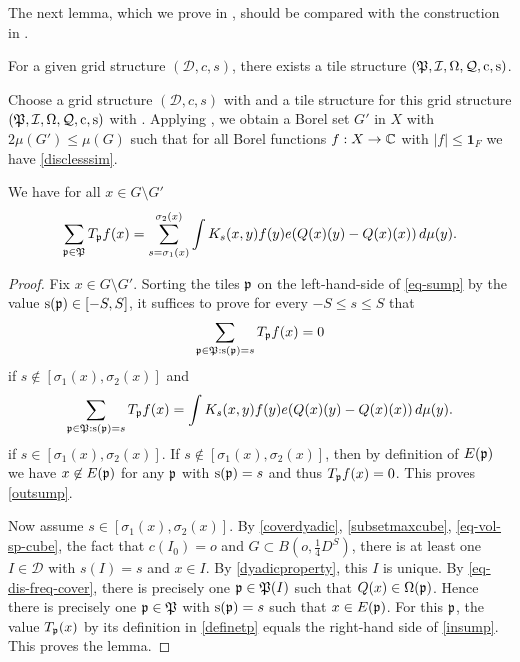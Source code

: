The next lemma, which we prove in , should be compared
with the construction in \cite[Lemma 2.12]{zk-polynomial}.

\begin{lemma}
    \label{tile-structure}
    \leanok
        For a given grid structure $(\mathcal{D}, c,s)$, there exists a tile structure
        $({\mathfrak P},{\mathcal{I}},{\Omega},{\mathcal{Q}},{\mathrm{c}},{\mathrm{s}})$.
\end{lemma}

Choose a grid structure $(\mathcal{D}, c,s)$ with  and a tile structure for this
grid structure $({\mathfrak P},{\mathcal{I}},{\Omega},{\mathcal{Q}},{\mathrm{c}},{\mathrm{s}})$ with .
Applying , we obtain a Borel set $G'$ in $X$ with $2\mu(G')\leq \mu(G)$ such that for all Borel functions $f:X\to \mathbb{C}$ with $|f|\le \mathbf{1}_F$
we have \eqref{disclesssim}.

\begin{lemma}
    \label{tile-sum-operator}
    \leanok
    We have for all $x\in G\setminus G'$
    \begin{equation}\label{eq-sump}
        \sum_{{\mathfrak p}\in {\mathfrak P}}T_{{\mathfrak p}} f(x)= \sum_{s=\sigma_1(x)}^{\sigma_2(x)}
        \int K_{s}(x,y) f(y) e({Q}(x)(y)-{Q}(x)(x))\, d\mu(y).
    \end{equation}
\end{lemma}
\begin{proof}
    \leanok
    Fix $x\in G\setminus G'$.
    Sorting the tiles ${\mathfrak p}$ on the left-hand-side of \eqref{eq-sump} by the value ${\mathrm{s}}({\mathfrak p})\in [-S,S]$,
    it suffices to prove for every $-S\le s\le S$ that
    \begin{equation}\label{outsump}
        \sum_{{\mathfrak p}\in {\mathfrak P}: {\mathrm{s}}({\mathfrak p})=s}T_{{\mathfrak p}} f(x)=0
    \end{equation}
    if $s\not\in [\sigma_1(x), \sigma_2(x)]$ and
    \begin{equation}\label{insump}
        \sum_{{\mathfrak p}\in {\mathfrak P}: {\mathrm{s}}({\mathfrak p})=s}T_{{\mathfrak p}} f(x)=
        \int K_{s}(x,y) f(y) e({Q}(x)(y) - {Q}(x)(x))\, d\mu(y).
    \end{equation}
    if $s\in [\sigma_1(x),\sigma_2(x)]$.
    If $s\not\in [\sigma_1(x), \sigma_2(x)]$, then by definition of $E({\mathfrak p})$ we have
    $x\not\in E({\mathfrak p})$ for any ${\mathfrak p}$ with ${\mathrm{s}}({\mathfrak p})=s$ and thus $T_{{\mathfrak p}} f(x)=0$. This proves
    \eqref{outsump}.

    Now assume $s\in [\sigma_1(x),\sigma_2(x)]$.
    By \eqref{coverdyadic}, \eqref{subsetmaxcube}, \eqref{eq-vol-sp-cube}, the fact that $c(I_0) = o$ and $G\subset B(o,\frac 14 D^S)$, there is at least
    one $I\in \mathcal{D}$ with $s(I)=s$ and $x\in I$.
    By \eqref{dyadicproperty}, this $I$ is unique. By \eqref{eq-dis-freq-cover}, there is precisely one ${\mathfrak p}\in {\mathfrak P}(I)$ such that
    ${Q}(x)\in {\Omega}({\mathfrak p})$. Hence there is precisely one ${\mathfrak p}\in {\mathfrak P}$ with ${\mathrm{s}}({\mathfrak p})=s$ such that
    $x\in E({\mathfrak p})$. For this ${\mathfrak p}$, the value $T_{{\mathfrak p}}(x)$ by its definition in \eqref{definetp}
    equals the right-hand side of \eqref{insump}. This proves the lemma.
\end{proof}

